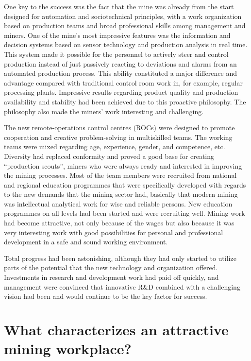 \documentclass[
  12pt,
]{scrbook}
\begin{document}
One key to the success was the fact that the mine was already from the start designed for automation and sociotechnical principles, with a work organization based on production teams and broad professional skills among management and miners. One of the mine's most impressive features was the information and decision systems based on sensor technology and production analysis in real time. This system made it possible for the personnel to actively steer and control production instead of just passively reacting to deviations and alarms from an automated production process. This ability constituted a major difference and advantage compared with traditional control room work in, for example, regular processing plants. Impressive results regarding product quality and production availability and stability had been achieved due to this proactive philosophy. The philosophy also made the miners' work interesting and challenging.

The new remote-operations control centres (ROCs) were designed to promote cooperation and creative problem-solving in multiskilled teams. The working teams were mixed regarding age, experience, gender, and competence, etc. Diversity had replaced conformity and proved a good base for creating ``production scouts'', miners who were always ready and interested in improving the mining processes. Most of the team members were recruited from national and regional education programmes that were specifically developed with regards to the new demands that the mining sector had, basically that modern mining was intellectual analytical work for wise and reliable persons. New education programmes on all levels had been started and were recruiting well. Mining work had become attractive, not only because of the wages but also because it was very interesting work with good possibilities for personal and professional development in a safe and sound working environment.

Total progress had been astonishing, although they had only started to utilize parts of the potential that the new technology and organization offered. Investments in research and development work had paid off quickly, and management were convinced that innovative R\&D combined with a challenging vision had been and would continue to be the key factor for success.

\hypertarget{what-characterizes-an-attractive-mining-workplace}{%
\chapter{What characterizes an attractive mining workplace?}\label{what-characterizes-an-attractive-mining-workplace}}
\end{document}
